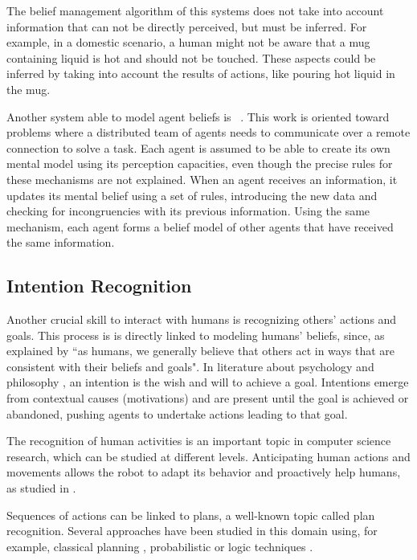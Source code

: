 The belief management algorithm of this systems does not take into account information that can not be directly perceived, but must be inferred. For example, in a domestic scenario, a human might not be aware that a mug containing liquid is hot and should not be touched. These aspects could be inferred by taking into account the results of actions, like pouring hot liquid in the mug.

Another system able to model agent beliefs is ~\cite{scheutz2013computational}. This work is oriented toward problems where a distributed team of agents needs to communicate over a remote connection to solve a task. Each agent is assumed to be able to create its own mental model using its perception capacities, even though the precise rules for these mechanisms are not explained. When an agent receives an information, it updates its mental belief using a set of rules, introducing the new data and checking for incongruencies with its previous information.  Using the same mechanism, each agent forms a belief model of other agents that have received the same information.


\subsection{Intention Recognition}
Another crucial skill to interact with humans is recognizing others' actions and goals. This process is is directly linked to modeling humans' beliefs, since, as explained by \cite{byom2013theory} ``as humans, we generally believe that others act in ways that are consistent with their beliefs and goals". In literature about psychology \cite{bruner1981} and philosophy \cite{bratman1984}, an intention is the wish and will to achieve a goal. Intentions emerge from contextual causes (motivations) and are present until the goal is achieved or abandoned, pushing agents to undertake actions leading to that goal.

The recognition of human activities is an important topic in computer science research, which can be studied at different levels. Anticipating human actions and movements allows the robot to adapt its behavior and proactively help humans, as studied in \cite{koppula2013anticipating}. 

Sequences of actions can be linked to plans, a well-known topic called plan recognition. Several approaches have been studied in this domain using, for example, classical planning \cite{ramirez2009plan}, probabilistic \cite{bui2003general} or logic techniques \cite{singla2011abductive}.

